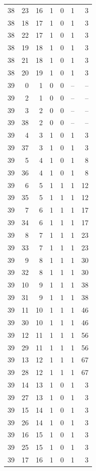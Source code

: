 \begin{longtable}{rrrrrrr}
38 & 23 & 16 & 1 & 0 & 1 & 3\\
38 & 18 & 17 & 1 & 0 & 1 & 3\\
38 & 22 & 17 & 1 & 0 & 1 & 3\\
38 & 19 & 18 & 1 & 0 & 1 & 3\\
38 & 21 & 18 & 1 & 0 & 1 & 3\\
38 & 20 & 19 & 1 & 0 & 1 & 3\\
39 & 0 & 1 & 0 & 0 & -- & --\\
39 & 2 & 1 & 0 & 0 & -- & --\\
39 & 3 & 2 & 0 & 0 & -- & --\\
39 & 38 & 2 & 0 & 0 & -- & --\\
39 & 4 & 3 & 1 & 0 & 1 & 3\\
39 & 37 & 3 & 1 & 0 & 1 & 3\\
39 & 5 & 4 & 1 & 0 & 1 & 8\\
39 & 36 & 4 & 1 & 0 & 1 & 8\\
39 & 6 & 5 & 1 & 1 & 1 & 12\\
39 & 35 & 5 & 1 & 1 & 1 & 12\\
39 & 7 & 6 & 1 & 1 & 1 & 17\\
39 & 34 & 6 & 1 & 1 & 1 & 17\\
39 & 8 & 7 & 1 & 1 & 1 & 23\\
39 & 33 & 7 & 1 & 1 & 1 & 23\\
39 & 9 & 8 & 1 & 1 & 1 & 30\\
39 & 32 & 8 & 1 & 1 & 1 & 30\\
39 & 10 & 9 & 1 & 1 & 1 & 38\\
39 & 31 & 9 & 1 & 1 & 1 & 38\\
39 & 11 & 10 & 1 & 1 & 1 & 46\\
39 & 30 & 10 & 1 & 1 & 1 & 46\\
39 & 12 & 11 & 1 & 1 & 1 & 56\\
39 & 29 & 11 & 1 & 1 & 1 & 56\\
39 & 13 & 12 & 1 & 1 & 1 & 67\\
39 & 28 & 12 & 1 & 1 & 1 & 67\\
39 & 14 & 13 & 1 & 0 & 1 & 3\\
39 & 27 & 13 & 1 & 0 & 1 & 3\\
39 & 15 & 14 & 1 & 0 & 1 & 3\\
39 & 26 & 14 & 1 & 0 & 1 & 3\\
39 & 16 & 15 & 1 & 0 & 1 & 3\\
39 & 25 & 15 & 1 & 0 & 1 & 3\\
39 & 17 & 16 & 1 & 0 & 1 & 3\\

\end{longtable}
